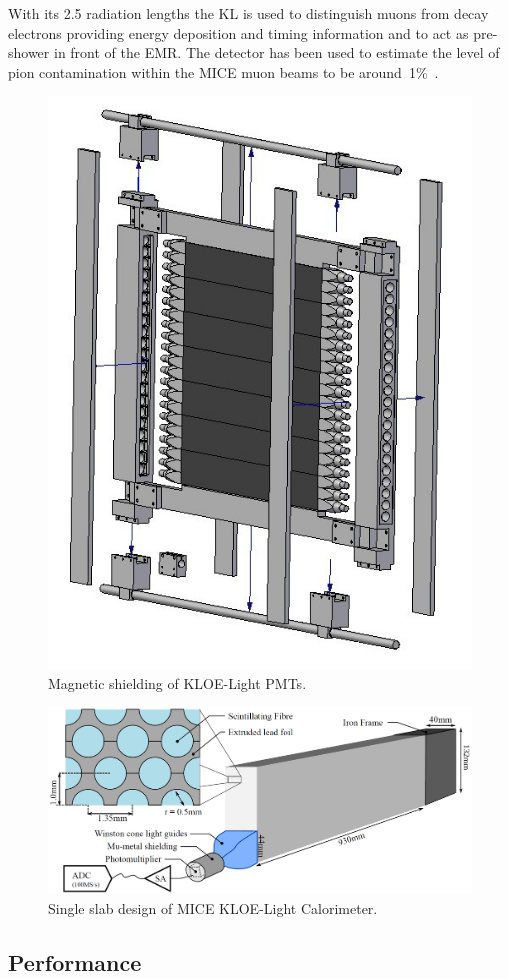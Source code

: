 With its 2.5 radiation lengths the KL is used to distinguish muons from decay electrons providing energy deposition and timing information and to act as pre-shower in front of the EMR.
The detector has been used to estimate the level of pion contamination within the MICE muon beams to be around~1\%~\cite{2016JInst..11P3001A}.
\begin{figure}
  \begin{center}
    \includegraphics[width=0.4\columnwidth]{./04-KL/Figures/KL1.png}
    \caption{Magnetic shielding of KLOE-Light PMTs.}
    \label{fig:KL1}
  \end{center}
\end{figure}
\begin{figure}
  \begin{center}
    \includegraphics[width=0.8\columnwidth]{./04-KL/Figures/KL2.png}
    \caption{Single slab design of MICE KLOE-Light Calorimeter.}
    \label{fig:KL2}
  \end{center}
\end{figure}



\subsection{Performance}
\label{SubSect:KL_Performance}

